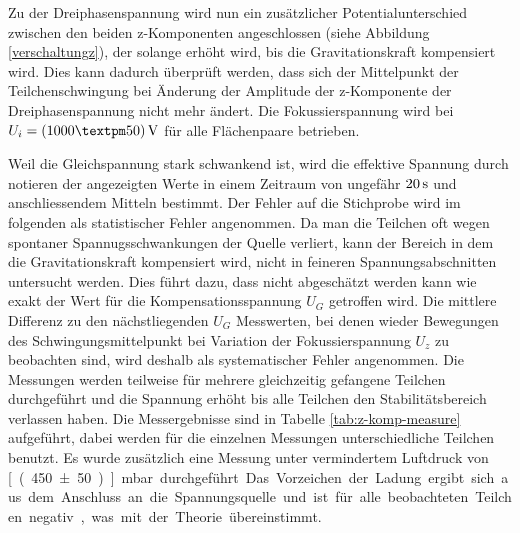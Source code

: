 \documentclass[a4paper,12pt]{article}
\begin{document}
Zu der Dreiphasenspannung wird nun ein zusätzlicher Potentialunterschied zwischen den beiden z-Komponenten angeschlossen (siehe Abbildung \ref{verschaltungz}), der solange erhöht wird, bis die Gravitationskraft kompensiert wird.
Dies kann dadurch überprüft werden, dass sich der Mittelpunkt der Teilchenschwingung bei Änderung der Amplitude der z-Komponente der Dreiphasenspannung nicht mehr ändert.
Die Fokussierspannung wird bei $U_i = \unit[(1000±50)]{V}$ für alle Flächenpaare betrieben.


Weil die Gleichspannung stark schwankend ist, wird die effektive Spannung durch notieren der angezeigten Werte in einem Zeitraum von ungefähr $\unit[20]{s}$ und anschliessendem Mitteln bestimmt. 
Der Fehler auf die Stichprobe wird im folgenden als statistischer Fehler angenommen.
Da man die Teilchen oft wegen spontaner Spannugsschwankungen der Quelle verliert, kann der Bereich in dem die Gravitationskraft kompensiert wird, nicht in feineren Spannungsabschnitten untersucht werden.
Dies führt dazu, dass nicht abgeschätzt werden kann wie exakt der Wert für die Kompensationsspannung $U_G$ getroffen wird.
Die mittlere Differenz zu den nächstliegenden $U_G$ Messwerten, bei denen wieder Bewegungen des Schwingungsmittelpunkt bei Variation der Fokussierspannung $U_z$ zu beobachten sind,
wird deshalb als systematischer Fehler angenommen.
Die Messungen werden teilweise für mehrere gleichzeitig gefangene Teilchen durchgeführt und die Spannung erhöht bis alle Teilchen den Stabilitätsbereich verlassen haben. Die Messergebnisse sind in
Tabelle \ref{tab:z-komp-measure} aufgeführt, dabei werden für die einzelnen Messungen unterschiedliche Teilchen benutzt. Es wurde zusätzlich eine Messung unter vermindertem Luftdruck von
 \unit[(450±50)]{mbar} durchgeführt.
Das Vorzeichen der Ladung ergibt sich aus dem Anschluss an die Spannungsquelle und ist für alle beobachteten Teilchen negativ, was mit der Theorie übereinstimmt.
\end{document}
